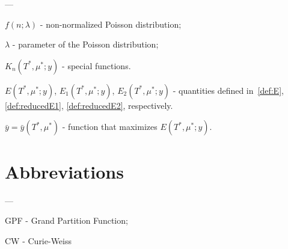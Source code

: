 ---

$f(n; \lambda)$ - non-normalized Poisson distribution;

$\lambda$ - parameter of the Poisson distribution;

$K_n(T^*,\mu^*;y)$ - special functions.

$E(T^*,\mu^*;y)$, $E_1(T^*,\mu^*;y)$, $E_2(T^*,\mu^*;y)$ - quantities defined in~\eqref{def:E}, \eqref{def:reducedE1}, \eqref{def:reducedE2}, respectively.

$\bar{y} = \bar{y}(T^*,\mu^*)$ - function that maximizes $E(T^*,\mu^*;y)$.



\section*{Abbreviations}
---

GPF - Grand Partition Function;

CW - Curie-Weiss